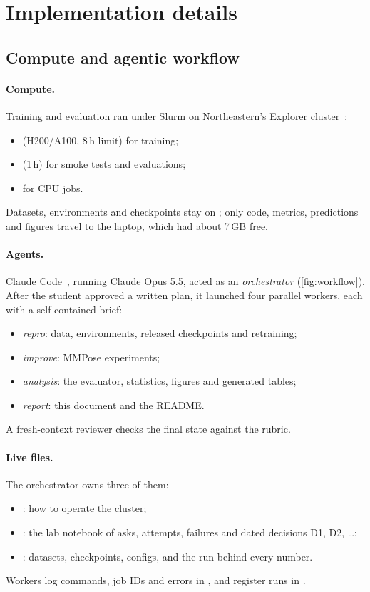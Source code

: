 \section{Implementation details}\label{app:details}

\subsection{Compute and agentic workflow}\label{app:workflow}

\paragraph{Compute.} Training and evaluation ran under Slurm on Northeastern's Explorer cluster~\citep{explorerdocs}:
\begin{itemize}[leftmargin=*]
  \item {} (H200/A100, 8\,h limit) for training;
  \item {} (1\,h) for smoke tests and evaluations;
  \item {} for CPU jobs.
\end{itemize}
Datasets, environments and checkpoints stay on ; only code, metrics, predictions and figures travel to the laptop, which had about 7\,GB free.

\paragraph{Agents.} Claude Code~\citep{claudecode}, running Claude Opus 5.5, acted as an \emph{orchestrator} (\cref{fig:workflow}). After the student approved a written plan, it launched four parallel workers, each with a self-contained brief:
\begin{itemize}[leftmargin=*]
  \item \emph{repro}: data, environments, released checkpoints and retraining;
  \item \emph{improve}: MMPose experiments;
  \item \emph{analysis}: the evaluator, statistics, figures and generated tables;
  \item \emph{report}: this document and the README.
\end{itemize}
A fresh-context reviewer checks the final state against the rubric.

\paragraph{Live files.} The orchestrator owns three of them:
\begin{itemize}[leftmargin=*]
  \item {}: how to operate the cluster;
  \item {}: the lab notebook of asks, attempts, failures and dated decisions D1, D2, \dots;
  \item {}: datasets, checkpoints, configs, and the run behind every number.
\end{itemize}
Workers log commands, job IDs and errors in , and register runs in .

